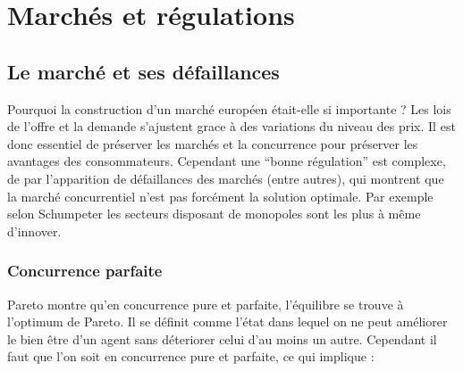 \section{Marchés et régulations} %
\label{prt:marches_et_regulations}

\subsection{Le marché et ses défaillances} %
\label{sec:le_marche_et_ses_defaillances}

Pourquoi la construction d'un marché européen était-elle si importante ? Les lois de l'offre et la demande s'ajustent grace à des variations du niveau des prix. Il est donc essentiel de préserver les marchés et la concurrence pour préserver les avantages des consommateurs. Cependant une ``bonne régulation'' est complexe, de par l'apparition de défaillances des marchés (entre autres), qui montrent que la marché concurrentiel n'est pas forcément la solution optimale. Par exemple selon Schumpeter les secteurs disposant de monopoles sont les plus à même d'innover.

\subsubsection{Concurrence parfaite} %
\label{sub:concurrence_parfaite}

Pareto montre qu'en concurrence pure et parfaite, l'équilibre se trouve à l'optimum de Pareto. Il se définit comme l'état dans lequel on ne peut améliorer le bien être d'un agent sans déteriorer celui d'au moins un autre. Cependant il faut que l'on soit en concurrence pure et parfaite, ce qui implique : 

